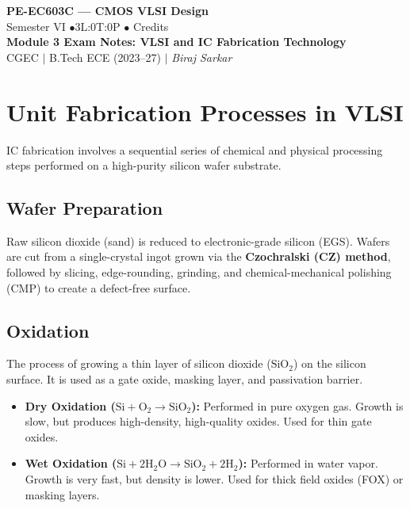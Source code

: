 \documentclass[12pt,a4paper]{article}
\begin{document}

\begin{center}
  {\LARGE\bfseries\color{myred} PE-EC603C --- CMOS VLSI Design}\\[5pt]
  {\normalsize\color{mydark} Semester VI \quad$\bullet$\quad 3L:0T:0P \quad$\bullet$ Credits}\\[3pt]
  {\normalsize\color{myteal}\textbf{Module 3 Exam Notes: VLSI and IC Fabrication Technology}}\\[3pt]
  {\small\color{mydark} CGEC \;$|$\; B.Tech ECE (2023--27) \;$|$\; \textit{Biraj Sarkar}}
\end{center}
\vspace{2pt}
\noindent{\color{myred}\rule{\linewidth}{1.5pt}}
\vspace{2pt}

\hypersetup{linkcolor=mydark}
\tableofcontents
\hypersetup{linkcolor=myteal}
\newpage

\section{Unit Fabrication Processes in VLSI}

IC fabrication involves a sequential series of chemical and physical processing steps performed on a high-purity silicon wafer substrate.

\subsection{Wafer Preparation}
Raw silicon dioxide (sand) is reduced to electronic-grade silicon (EGS). Wafers are cut from a single-crystal ingot grown via the \textbf{Czochralski (CZ) method}, followed by slicing, edge-rounding, grinding, and chemical-mechanical polishing (CMP) to create a defect-free surface.

\subsection{Oxidation}
The process of growing a thin layer of silicon dioxide ($\text{SiO}_2$) on the silicon surface. It is used as a gate oxide, masking layer, and passivation barrier.
\begin{itemize}[leftmargin=*, itemsep=3pt]
  \item \textbf{Dry Oxidation ($\text{Si} + \text{O}_2 \to \text{SiO}_2$):} Performed in pure oxygen gas. Growth is slow, but produces high-density, high-quality oxides. Used for thin gate oxides.
  \item \textbf{Wet Oxidation ($\text{Si} + 2\text{H}_2\text{O} \to \text{SiO}_2 + 2\text{H}_2$):} Performed in water vapor. Growth is very fast, but density is lower. Used for thick field oxides (FOX) or masking layers.
\end{itemize}
\end{document}
